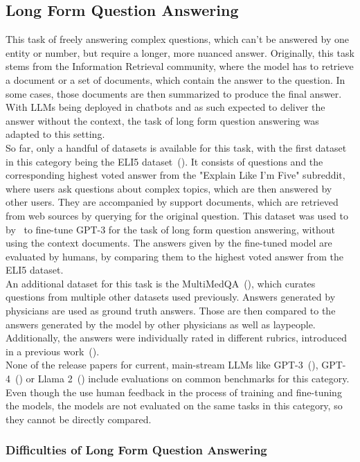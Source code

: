 \subsection{Long Form Question Answering}\label{free-form-qa}
This task of freely answering complex questions, which can't be answered by one entity or number, but require a longer, more nuanced answer.
Originally, this task stems from the Information Retrieval community, where the model has to retrieve a document or a set of documents, which contain the answer to the question.
In some cases, those documents are then summarized to produce the final answer.
With LLMs being deployed in chatbots and as such expected to deliver the answer without the context, the task of long form question answering was adapted to this setting.
\\
So far, only a handful of datasets is available for this task, with the first dataset in this category being the ELI5 dataset~(\cite{fan:2019}).
It consists of questions and the corresponding highest voted answer from the "Explain Like I'm Five" subreddit, where users ask questions about complex topics, which are then answered by other users.
They are accompanied by support documents, which are retrieved from web sources by querying for the original question.
This dataset was used to by~\cite{nakano:2021} to fine-tune GPT-3 for the task of long form question answering, without using the context documents.
The answers given by the fine-tuned model are evaluated by humans, by comparing them to the highest voted answer from the ELI5 dataset.
\\ 
An additional dataset for this task is the MultiMedQA~(\cite{singhal:2023}), which curates questions from multiple other datasets used previously. 
Answers generated by physicians are used as ground truth answers.
Those are then compared to the answers generated by the model by other physicians as well as laypeople.
Additionally, the answers were individually rated in different rubrics, introduced in a previous work~(\cite{singhal:2022}).
\\
None of the release papers for current, main-stream LLMs like GPT-3~(\cite{brown:2020}), GPT-4~(\cite{openai:2023}) or Llama 2~(\cite{touvron:2023}) include evaluations on common benchmarks for this category.
Even though the use human feedback in the process of training and fine-tuning the models, the models are not evaluated on the same tasks in this category, so they cannot be directly compared.

\subsubsection{Difficulties of Long Form Question Answering}\label{free-form-qa-difficulties}





